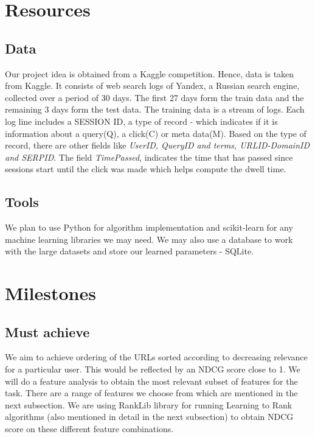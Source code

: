 \documentclass[11pt]{article}
\begin{document}
\section{Resources}
\subsection{Data}
Our project idea is obtained from a Kaggle competition. Hence, data is taken from Kaggle. It consists of web search logs of Yandex, a Russian search engine, collected over a period of 30 days. The first 27 days form the train data and the remaining 3 days form the test data. \newline
The training data is a stream of logs. Each log line includes a SESSION ID, a type of record  - which indicates if it is information about a query(Q), a click(C) or meta data(M). Based on the type of record, there are other fields like \textsl{UserID, QueryID and terms, URLID-DomainID and SERPID}. The field \textsl{TimePassed}, indicates the time that has passed since sessions start until the click was made which helps compute the dwell time.

\subsection{Tools}
We plan to use Python for algorithm implementation and scikit-learn for any machine learning libraries we may need. We may also use a database to work with the large datasets and store our learned parameters - SQLite.

\section{Milestones}
\subsection{Must achieve}
We aim to achieve ordering of the URLs sorted according to decreasing relevance for a particular user. This would be reflected by an NDCG score close to 1. We will do a feature analysis to obtain the most relevant subset of features for the task.  There are a range of features we choose from which are mentioned in the next subsection. We are using  RankLib library for running Learning to Rank algorithms (also mentioned in detail in the next subsection) to obtain NDCG score on these different feature combinations. 
\end{document}
